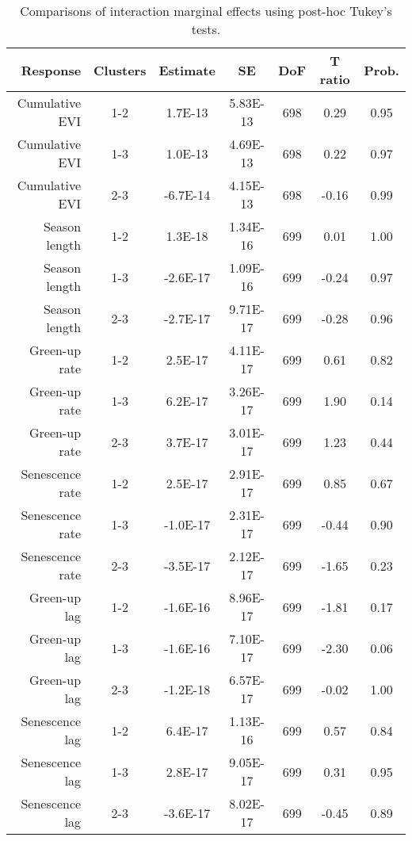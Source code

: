 \begin{table}[H]
\centering
\begin{tabular}{rcccccc}
  \hline
Response & Clusters & Estimate & SE & DoF & T ratio & Prob. \\ 
  \hline
Cumulative EVI & 1-2 & 1.7E-13 & 5.83E-13 & 698 & 0.29 & 0.95 \\ 
  Cumulative EVI & 1-3 & 1.0E-13 & 4.69E-13 & 698 & 0.22 & 0.97 \\ 
  Cumulative EVI & 2-3 & -6.7E-14 & 4.15E-13 & 698 & -0.16 & 0.99 \\ 
   \hline
Season length & 1-2 & 1.3E-18 & 1.34E-16 & 699 & 0.01 & 1.00 \\ 
  Season length & 1-3 & -2.6E-17 & 1.09E-16 & 699 & -0.24 & 0.97 \\ 
  Season length & 2-3 & -2.7E-17 & 9.71E-17 & 699 & -0.28 & 0.96 \\ 
   \hline
Green-up rate & 1-2 & 2.5E-17 & 4.11E-17 & 699 & 0.61 & 0.82 \\ 
  Green-up rate & 1-3 & 6.2E-17 & 3.26E-17 & 699 & 1.90 & 0.14 \\ 
  Green-up rate & 2-3 & 3.7E-17 & 3.01E-17 & 699 & 1.23 & 0.44 \\ 
   \hline
Senescence rate & 1-2 & 2.5E-17 & 2.91E-17 & 699 & 0.85 & 0.67 \\ 
  Senescence rate & 1-3 & -1.0E-17 & 2.31E-17 & 699 & -0.44 & 0.90 \\ 
  Senescence rate & 2-3 & -3.5E-17 & 2.12E-17 & 699 & -1.65 & 0.23 \\ 
   \hline
Green-up lag & 1-2 & -1.6E-16 & 8.96E-17 & 699 & -1.81 & 0.17 \\ 
  Green-up lag & 1-3 & -1.6E-16 & 7.10E-17 & 699 & -2.30 & 0.06 \\ 
  Green-up lag & 2-3 & -1.2E-18 & 6.57E-17 & 699 & -0.02 & 1.00 \\ 
   \hline
Senescence lag & 1-2 & 6.4E-17 & 1.13E-16 & 699 & 0.57 & 0.84 \\ 
  Senescence lag & 1-3 & 2.8E-17 & 9.05E-17 & 699 & 0.31 & 0.95 \\ 
  Senescence lag & 2-3 & -3.6E-17 & 8.02E-17 & 699 & -0.45 & 0.89 \\ 
  \end{tabular}
\caption{Comparisons of interaction marginal effects using post-hoc Tukey's tests.} 
\label{lsq_terms}
\end{table}

